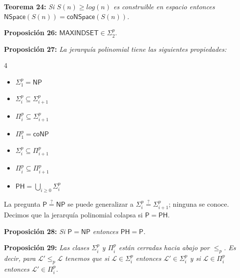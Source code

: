 \documentclass{article}
\begin{document}
\begin{flushleft}
  \textbf{Teorema 24:}
  \textit{Si $S(n) \geq log(n)$ es construible en espacio entonces $\mathsf{NSpace}(S(n)) = \mathsf{coNSpace}
  (S(n))$.}
\end{flushleft}

\begin{flushleft}
  \textbf{Proposición 26:}
  $\textsf{MAXINDSET} \in \Sigma ^p _2$.
\end{flushleft}

\begin{flushleft}
  \textbf{Proposición 27:}
  \textit{La jerarquía polinomial tiene las siguientes propiedades:}
\end{flushleft}
\begin{multicols}{4}
  \begin{itemize}
    \item $\Sigma^p_1 = \mathsf{NP}$
    \item $\Sigma^p_i \subseteq \Sigma^p_{i+1}$
    \item $\Pi^p_i \subseteq \Sigma^p_{i+1}$
    \item $\Pi^p_1 = \mathsf{coNP}$
    \item $\Sigma^p_i \subseteq \Pi^p_{i+1}$
    \item $\Pi^p_i \subseteq \Pi^p_{i+1}$
    \item $\mathsf{PH} = \bigcup_{i \geq 0} \Sigma^p_{i}$
  \end{itemize}
\end{multicols}
\begin{flushleft}
  La pregunta $\mathsf{P} \stackrel{?}{=} \mathsf{NP}$ se puede generalizar a $\Sigma^p_i \stackrel{?}{=} 
  \Sigma^p_{i+1}$; ninguna se conoce. Decimos que la jerarquía polinomial colapsa si $\mathsf{P} = \mathsf{PH}$.
\end{flushleft}

\begin{flushleft}
  \textbf{Proposición 28:}
  \textit{Si $\mathsf{P} = \mathsf{NP}$ entonces $\mathsf{PH} = \mathsf{P}$.}
\end{flushleft}

\begin{flushleft}
  \textbf{Proposición 29:}
  \textit{Las clases $\Sigma^p_i$ y $\Pi^p_i$ están cerradas hacia abajo por $\leq_p$. Es decir, para $
  \mathcal{L}' \leq_p \mathcal{L}$ tenemos que si $\mathcal{L} \in \Sigma^p_i$ entonces $\mathcal{L}' \in 
  \Sigma^p_i$ y si $\mathcal{L} \in \Pi^p_i$ entonces $\mathcal{L}' \in \Pi^p_i$.}
\end{flushleft}
\end{document}
